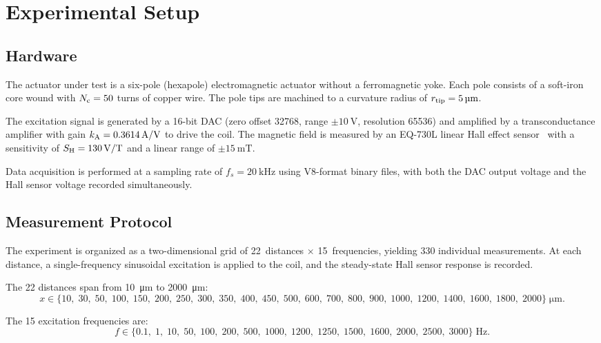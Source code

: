 \section{Experimental Setup}
\label{sec:experiment}

\subsection{Hardware}
\label{sec:hardware}

The actuator under test is a six-pole (hexapole) electromagnetic actuator
without a ferromagnetic yoke. Each pole consists of a soft-iron core wound
with $N_\mathrm{c} = 50$ turns of copper wire. The pole tips are machined to a
curvature radius of $\rtip = \SI{5}{\um}$.

The excitation signal is generated by a 16-bit DAC (zero offset 32768, range
$\pm\SI{10}{\volt}$, resolution 65536) and amplified by a transconductance
amplifier with gain $k_\mathrm{A} = \SI{0.3614}{\ampere/\volt}$ to drive the coil.
The magnetic field is measured by an EQ-730L linear Hall effect
sensor~\cite{EQ730L} with a sensitivity of $S_\mathrm{H} = \SI{130}{\volt/\tesla}$
and a linear range of $\pm\SI{15}{\milli\tesla}$.

Data acquisition is performed at a sampling rate of
$f_s = \SI{20}{\kilo\hertz}$ using V8-format binary files, with both the
DAC output voltage and the Hall sensor voltage recorded simultaneously.

\subsection{Measurement Protocol}
\label{sec:protocol}

The experiment is organized as a two-dimensional grid of
22~distances $\times$ 15~frequencies, yielding 330 individual measurements.
At each distance, a single-frequency sinusoidal excitation is applied to the
coil, and the steady-state Hall sensor response is recorded.

The 22 distances span from \SI{10}{\um} to \SI{2000}{\um}:
\begin{equation*}
x \in \{10,\; 30,\; 50,\; 100,\; 150,\; 200,\; 250,\; 300,\; 350,\; 400,\;
450,\; 500,\; 600,\; 700,\; 800,\; 900,\; 1000,\; 1200,\; 1400,\; 1600,\;
1800,\; 2000\} \;\si{\um}.
\end{equation*}

The 15 excitation frequencies are:
\begin{equation*}
f \in \{0.1,\; 1,\; 10,\; 50,\; 100,\; 200,\; 500,\; 1000,\; 1200,\; 1250,\;
1500,\; 1600,\; 2000,\; 2500,\; 3000\} \;\si{\hertz}.
\end{equation*}

